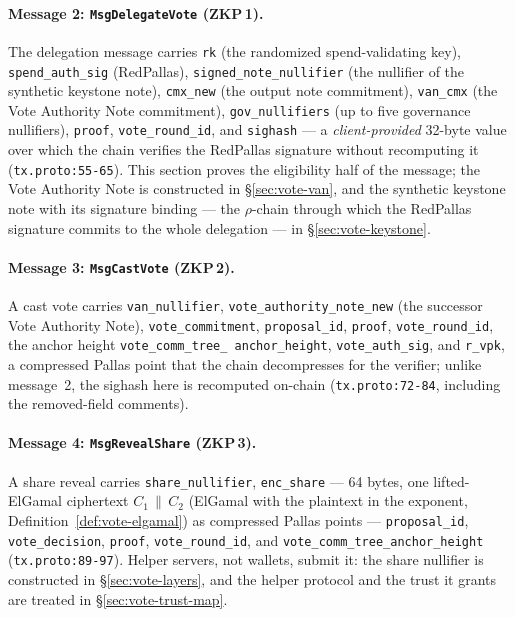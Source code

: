 \documentclass[11pt,a4paper]{article}
\theoremstyle{definition}
\begin{document}
\paragraph{Message 2: \texttt{MsgDelegateVote} (ZKP\,1).} The delegation
message carries \texttt{rk} (the randomized spend-validating key),
\texttt{spend\_auth\_sig} (RedPallas), \texttt{signed\_note\_nullifier} (the
nullifier of the synthetic keystone note), \texttt{cmx\_new} (the output
note commitment), \texttt{van\_cmx} (the Vote Authority Note commitment),
\texttt{gov\_nullifiers} (up to five governance nullifiers),
\texttt{proof}, \texttt{vote\_round\_id}, and \texttt{sighash} --- a
\emph{client-provided} 32-byte value over which the chain verifies the
RedPallas signature without recomputing it (\texttt{tx.proto:55-65}). This
section proves the eligibility half of the message; the Vote Authority Note
is constructed in \S\ref{sec:vote-van}, and the synthetic keystone note
with its signature binding --- the $\rho$-chain through which the RedPallas
signature commits to the whole delegation --- in
\S\ref{sec:vote-keystone}.

\paragraph{Message 3: \texttt{MsgCastVote} (ZKP\,2).} A cast vote carries
\texttt{van\_nullifier},
\texttt{vote\_\allowbreak authority\_\allowbreak note\_\allowbreak new}
(the successor
Vote Authority Note), \texttt{vote\_commitment}, \texttt{proposal\_id},
\texttt{proof}, \texttt{vote\_round\_id}, the anchor height
\texttt{vote\_\allowbreak comm\_\allowbreak tree\_\allowbreak
anchor\_\allowbreak height}, \texttt{vote\_auth\_sig}, and
\texttt{r\_vpk}, a compressed Pallas point that the chain decompresses for
the verifier; unlike message~2, the sighash here is recomputed on-chain
(\texttt{tx.proto:72-84}, including the removed-field comments).

\paragraph{Message 4: \texttt{MsgRevealShare} (ZKP\,3).} A share reveal
carries \texttt{share\_nullifier}, \texttt{enc\_share} --- 64 bytes, one
lifted-ElGamal ciphertext $C_1 \,\|\, C_2$ (ElGamal with the plaintext
in the exponent, Definition~\ref{def:vote-elgamal}) as compressed Pallas
points ---
\texttt{proposal\_id}, \texttt{vote\_decision}, \texttt{proof},
\texttt{vote\_round\_id}, and \texttt{vote\_comm\_tree\_anchor\_height}
(\texttt{tx.proto:89-97}). Helper servers, not wallets, submit it: the
share nullifier is constructed in \S\ref{sec:vote-layers}, and the helper
protocol and the trust it grants are treated in
\S\ref{sec:vote-trust-map}.
\end{document}
